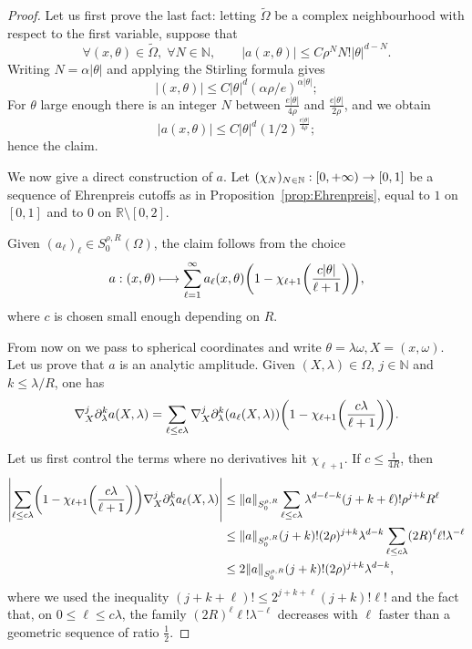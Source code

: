 \documentclass[10pt]{amsart}
\theoremstyle{definition}\newtheorem{defi}[theo]{Definition}\newtheorem{rema}[theo]{Remark}\newtheorem{exam}[theo]{Example}\newtheorem{exem}[theo]{Example}\newtheorem{nota}[theo]{Notation}
\newcommand\1{\mathds{1}}
\newcommand{\R}{\mathbb{R}}
\newcommand{\N}{\mathbb{N}}
\let\oldforall\forall
\renewcommand*{\forall}{\mathrel{\oldforall}}
\renewcommand*{\to}{\mathchoice{\longrightarrow}{\rightarrow}{\rightarrow}{\rightarrow}}
\let\oldmapsto\mapsto
\renewcommand*{\mapsto}{\mathchoice{\longmapsto}{\oldmapsto}{\oldmapsto}{\oldmapsto}}
\let\originalleft\left
\let\originalright\right
\renewcommand{\left}{\mathopen{}\mathclose\bgroup\originalleft}
\renewcommand{\right}{\aftergroup\egroup\originalright}
\begin{document}
\begin{proof}
Let us first prove the last fact: letting $\widetilde{\Omega}$ be a complex neighbourhood with respect to the first variable, suppose that
\[
\forall (x,\theta)\in \widetilde{\Omega}, \;\forall N\in \N,\qquad |a(x,\theta)|\leq C\rho^NN!|\theta|^{d-N}.
\]
Writing $N=\alpha|\theta|$ and applying the Stirling formula gives
\[
|(x,\theta)|\leq C|\theta|^d(\alpha\rho/e)^{\alpha|\theta|} ;
\]
For $\theta$ large enough there is an integer $N$ between $\frac{e|\theta|}{4\rho}$ and $\frac{e|\theta|}{2\rho}$, and we obtain
\[
|a(x,\theta)|\leq C|\theta|^d(1/2)^{\frac{e|\theta|}{4\rho}};
\]
hence the claim.

We now give a direct construction of $a$. Let $(\chi_N)_{N\in \N}:[0,+\infty)\to [0,1]$ be a sequence of Ehrenpreis cutoffs as in Proposition~\ref{prop:Ehrenpreis}, equal to $1$ on $[0,1]$ and to $0$ on $\R\setminus [0,2]$.

Given $(a_\ell)_\ell\in S^{\rho,R}_0(\Omega)$, the claim follows from the choice
\[
a:(x,\theta)\mapsto
\sum_{\ell=1}^{\infty}a_{\ell}(x,\theta)\left(1-\chi_{\ell+1}\left(\frac{c|\theta|}{\ell+1}\right)\right),
\]
where $c$ is chosen small enough depending on $R$.

From now on we pass to spherical coordinates and write $\theta=\lambda\omega,X=(x,\omega)$. Let us prove that $a$ is an analytic amplitude. Given $(X,\lambda)\in \Omega$, $j\in \N$ and $k\leq \lambda/R$, one has
\[
\nabla^j_{X}\partial^k_{\lambda}a(X,\lambda)=\sum_{\ell\leq c\lambda}\nabla^j_{X}\partial^k_{\lambda}(a_{\ell}(X,\lambda))\left(1-\chi_{\ell+1}\left(\frac{c\lambda}{\ell+1}\right)\right).
\]

Let us first control the terms where no derivatives hit $\chi_{\ell+1}$. If $c\leq \frac{1}{4R}$, then
\begin{align*}
\left|\sum_{\ell\leq c\lambda}\left(1-\chi_{\ell+1}\left(\frac{c\lambda}{\ell+1}\right)\right)\nabla^j_{X}\partial^k_{\lambda}a_\ell(X,\lambda)\right| &
\leq \|a\|_{S^{\rho,R}_0}\sum_{\ell\leq c\lambda}\lambda^{d-\ell-k}(j+k+\ell)!\rho^{j+k}R^{\ell}\\
&\leq
\|a\|_{S^{\rho,R}_0}(j+k)!(2\rho)^{j+k}\lambda^{d-k}\sum_{\ell\leq c\lambda}(2R)^{\ell}\ell!\lambda^{-\ell}\\
&\leq 2\|a\|_{S^{\rho,R}_0}(j+k)!(2\rho)^{j+k}\lambda^{d-k},
\end{align*}
where we used the inequality $(j+k+\ell)!\leq 2^{j+k+\ell}(j+k)!\ell!$ and the fact that, on $0\leq \ell\leq c\lambda$, the family $(2R)^{\ell}\ell!\lambda^{-\ell}$ decreases with $\ell$ faster than a geometric sequence of ratio $\frac 12$.


\end{proof}
\end{document}
